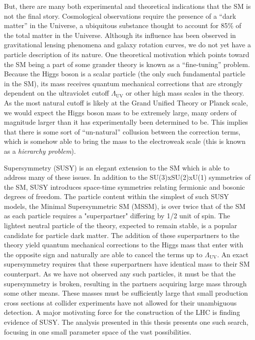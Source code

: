 But, there are many both experimental and theoretical indications that the SM is not the final story. Cosmological observations require the presence of a ``dark matter'' in the Universe, a ubiquitous substance thought to account for 85\% of the total matter in the Universe. Although its influence has been observed in gravitational lensing phenomena and galaxy rotation curves, we do not yet have a particle description of its nature. One theoretical motivation which points toward the SM being a part of some grander theory is known as a ``fine-tuning'' problem. Because the Higgs boson is a scalar particle (the only such fundamental particle in the SM), its mass receives quantum mechanical corrections that are strongly dependent on the ultraviolet cutoff $\Lambda_{\textrm{UV}}$ or other high mass scales in the theory. As the most natural cutoff is likely at the Grand Unified Theory or Planck scale, we would expect the Higgs boson mass to be extremely large, many orders of magnitude larger than it has experimentally been determined to be. This implies that there is some sort of ``un-natural'' collusion between the correction terms, which is somehow able to bring the mass to the electroweak scale (this is known as a \textit{hierarchy problem}).

Supersymmetry (SUSY) is an elegant extension to the SM which is able to address many of these issues. In addition to the SU(3)xSU(2)xU(1) symmetries of the SM, SUSY introduces space-time symmetries relating fermionic and bosonic degrees of freedom. The particle content within the simplest of such SUSY models, the Minimal Supersymmetric SM (MSSM), is over twice that of the SM as each particle requires a "superpartner" differing by 1/2 unit of spin. The lightest neutral particle of the theory, expected to remain stable, is a popular candidate for particle dark matter. The addition of these superpartners to the theory yield quantum mechanical corrections to the Higgs mass that enter with the opposite sign and naturally are able to cancel the terms up to $\Lambda_{\textrm{UV}}$. An exact supersymmetry requires that these superpartners have identical mass to their SM counterpart. As we have not observed any such particles, it must be that the supersymmetry is broken, resulting in the partners acquiring large mass through some other means. These masses must be sufficiently large that small production cross sections at collider experiments have not allowed for their unambiguous detection. A major motivating force for the construction of the LHC is finding evidence of SUSY. The analysis presented in this thesis presents one such search, focusing in one small parameter space of the vast possibilities.

